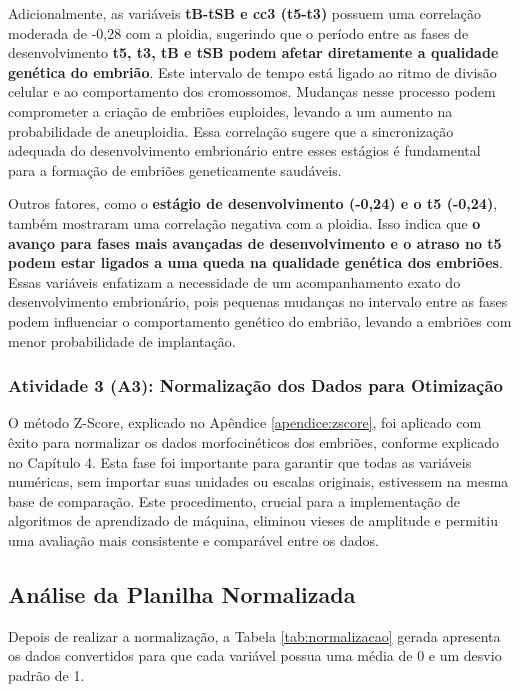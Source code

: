 Adicionalmente, as variáveis \textbf{tB-tSB e cc3 (t5-t3)} possuem uma correlação moderada de -0,28 com a ploidia, sugerindo que o período entre as fases de desenvolvimento \textbf{t5, t3, tB e tSB podem afetar diretamente a qualidade genética do embrião}. Este intervalo de tempo está ligado ao ritmo de divisão celular e ao comportamento dos cromossomos. Mudanças nesse processo podem comprometer a criação de embriões euploides, levando a um aumento na probabilidade de aneuploidia. Essa correlação sugere que a sincronização adequada do desenvolvimento embrionário entre esses estágios é fundamental para a formação de embriões geneticamente saudáveis.

Outros fatores, como o \textbf{estágio de desenvolvimento (-0,24) e o t5 (-0,24)}, também mostraram uma correlação negativa com a ploidia. Isso indica que \textbf{o avanço para fases mais avançadas de desenvolvimento e o atraso no t5 podem estar ligados a uma queda na qualidade genética dos embriões}. Essas variáveis enfatizam a necessidade de um acompanhamento exato do desenvolvimento embrionário, pois pequenas mudanças no intervalo entre as fases podem influenciar o comportamento genético do embrião, levando a embriões com menor probabilidade de implantação.

\subsubsection{Atividade 3 (A3): Normalização dos Dados para Otimização}

O método Z-Score, explicado no Apêndice \ref{apendice:zscore}, foi aplicado com êxito para normalizar os dados morfocinéticos dos embriões, conforme explicado no Capítulo 4. Esta fase foi importante para garantir que todas as variáveis numéricas, sem importar suas unidades ou escalas originais, estivessem na mesma base de comparação. Este procedimento, crucial para a implementação de algoritmos de aprendizado de máquina, eliminou vieses de amplitude e permitiu uma avaliação mais consistente e comparável entre os dados. 

\subsection*{Análise da Planilha Normalizada}
Depois de realizar a normalização, a Tabela \ref{tab:normalizacao} gerada apresenta os dados convertidos para que cada variável possua uma média de 0 e um desvio padrão de 1. 

